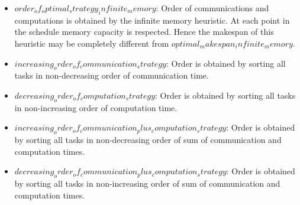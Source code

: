 \documentclass[runningheads]{llncs} %
\begin{document}
\begin{itemize}[a)]
	\item $order_of_optimal_strategy_infinite_memory $: Order of communications and computations is obtained by the infinite memory heuristic. At each point in the schedule memory capacity is respected. Hence the makespan of this heuristic may be completely different from $optimal_makespan_infinite_memory$.
	
	\item $increasing_order_of_communication_strategy$: Order is obtained by sorting all tasks in non-decreasing order of communication time. 
	
	\item $decreasing_order_of_computation_strategy$: Order is obtained by sorting all tasks in non-increasing order of computation time. 
	\item $increasing_order_of_communication_plus_computation_strategy$: Order is obtained by sorting all tasks in non-decreasing order of sum of communication and computation times.
	\item $decreasing_order_of_communication_plus_computation_strategy$: Order is obtained by sorting all tasks in non-increasing order of sum of communication and computation times.
	
\end{itemize}
\end{document}

